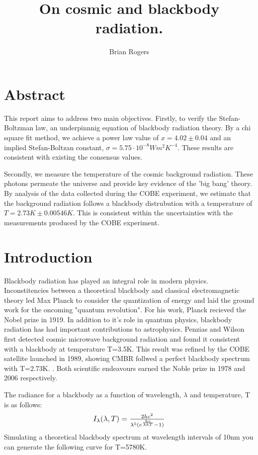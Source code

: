 \documentclass{article}%
\title{On cosmic and blackbody radiation.}%
\author{Brian Rogers}%
\begin{document}
%
\normalsize%
\maketitle%
\section{Abstract}%
\label{sec:Abstract}%

This report aims to address two main objectives. Firstly, to verify the Stefan{-}Boltzman law, 
an underpinnnig equation of blackbody radiation theory.
By a chi square fit method, we achieve a power law value of $x=4.02 \pm 0.04$ 
and an implied Stefan-Boltzan constant, $\sigma =5.75 \cdot 10^{-8}Wm^{2}K^{-4} $. 
These results are consistent with existing the consensus values. \cite{Boltzman} \cite{Martin} \par
Secondly, we measure the temperature of the cosmic background radiation. These photons permeate the universe and
provide key evidence of the 'big bang' theory.  By analysis of the data collected during the COBE experiment, 
we estimate that the background radiation follows a blackbody distrubution with a temperature of $T = 2.73K \pm 0.00546K$.
This is consistent within the uncertainties with the measurements produced by the COBE experiment. \cite{Mather}

%
\section{Introduction}%
\label{sec:Introduction}%

Blackbody radiation has played an integral role in modern physics.
Inconstitencies between a theoretical blackbody and classical electromagnetic theory
led Max Planck to consider the quantization of energy and laid the ground work for the oncoming "quantum revolution".\cite{Baggot}
For his work, Planck recieved the Nobel prize in 1919.
In addition to it's role in quantum physics, blackbody radiation has had important contributions to astrophysics.
Penzias and Wilson  first detected cosmic microwave background radiation and found it consistent with a blackbody
at temperature T=3.5K. \cite{Wilson} This result was refined by the COBE satellite launched in 1989, showing CMBR follwed a perfect blackbody spectrum with T=2.73K. \cite{Mather}.
Both scientific endeavours earned the Noble prize in 1978 and 2006 respectively.  


The radiance for a blackbody as a function of wavelength, $\lambda$ and temperature, T is as follows:
\begin{equation}
  \resizebox{.3\hsize}{!}{$I_{\lambda}(\lambda,T) = \frac{2hc^2}{\lambda^5 (e^ \frac{hc}{\lambda kT} - 1)}$}
  \end{equation}
Simulating a theoretical blackbody spectrum at wavelength intervals of 10nm you can generate the following 
curve for T=5780K.
\end{document}
